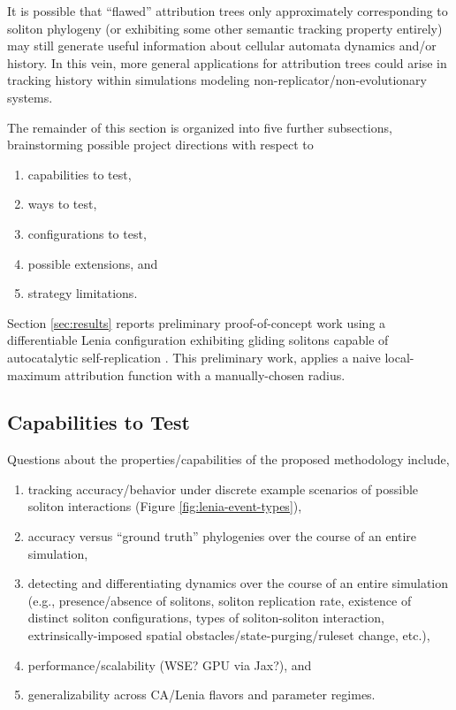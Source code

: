 It is possible that ``flawed'' attribution trees only approximately corresponding to soliton phylogeny (or exhibiting some other semantic tracking property entirely) may still generate useful information about cellular automata dynamics and/or history.
In this vein, more general applications for attribution trees could arise in tracking history within simulations modeling non-replicator/non-evolutionary systems.

The remainder of this section is organized into five further subsections, brainstorming possible project directions with respect to
\begin{enumerate}
\item capabilities to test,
\item ways to test,
\item configurations to test,
\item possible extensions, and
\item strategy limitations.
\end{enumerate}

Section \ref{sec:results} reports preliminary proof-of-concept work using a differentiable Lenia configuration exhibiting gliding solitons capable of autocatalytic self-replication \citep{hamon2022learning}.
This preliminary work, applies a naive local-maximum attribution function with a manually-chosen radius.

\subsection{Capabilities to Test}

Questions about the properties/capabilities of the proposed methodology include,
\begin{enumerate}
\item tracking accuracy/behavior under discrete example scenarios of possible soliton interactions (Figure \ref{fig:lenia-event-types}),
\item accuracy versus ``ground truth'' phylogenies over the course of an entire simulation,
\item detecting and differentiating dynamics over the course of an entire simulation (e.g., presence/absence of solitons, soliton replication rate, existence of distinct soliton configurations, types of soliton-soliton interaction, extrinsically-imposed spatial obstacles/state-purging/ruleset change, etc.),
\item performance/scalability (WSE? GPU via Jax?), and
\item generalizability across CA/Lenia flavors and parameter regimes.
\end{enumerate}


